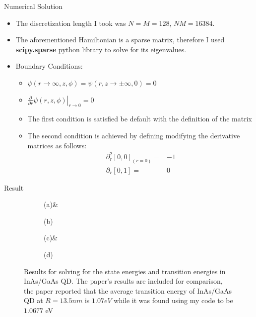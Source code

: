 \documentclass{beamer}
\begin{document}
\begin{frame}{Numerical Solution}
    \begin{itemize}
        \item The discretization length I took was $N = M = 128$, $NM = 16384$.
        \item The aforementioned Hamiltonian is a sparse matrix, therefore I used \textbf{scipy.sparse} python library to solve for its eigenvalues.
        \item Boundary Conditions:
        \begin{itemize}
            \item $\psi(r \to \infty, z, \phi) = \psi(r, z \to \pm\infty, 0) = 0$
            \item $\left.\frac{\partial}{\partial r}\psi(r, z, \phi)\right|_{r\to 0} = 0$
            \item The first condition is satisfied be default with the definition of the matrix
            \item The second condition is achieved by defining modifying the derivative matrices as follows:
            \begin{align}
                \partial^2_r [0, 0]_{(r=0)} =& -1\\
                \partial_r [0, 1] =& 0
            \end{align}
        \end{itemize}
    \end{itemize}
\end{frame}


\begin{frame}{Result}
\begin{figure}
    \centering
    \begin{subfigure}
        \texttt{[image: Qdot1ML.png]}(a)&
    \end{subfigure}
    \begin{subfigure}
        \texttt{[image: Tenergies.png]}(b)
    \end{subfigure}
    \begin{subfigure}
        \texttt{[image: Paper\_energies.png]}(c)&
    \end{subfigure}
    \begin{subfigure}
        \texttt{[image: paper\_Transitions.png]}(d)
    \end{subfigure}
    \caption{Results for solving for the state energies and transition energies in InAs/GaAs QD. The paper's results are included for comparison, the paper reported that the average transition energy of InAs/GaAs QD at $R = 13.5nm$ is $1.07eV$ while it was found using my code to be $1.0677$ eV}
    \label{fig: results}
\end{figure}
    
\end{frame}
\end{document}
